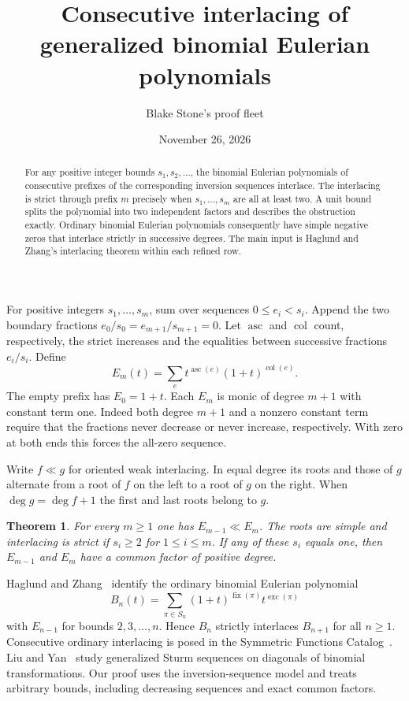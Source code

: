 \documentclass[11pt]{article}
\title{Consecutive interlacing of generalized binomial Eulerian polynomials}
\author{Blake Stone's proof fleet}
\date{November 26, 2026}
\newtheorem{theorem}{Theorem}
\begin{document}
\maketitle
\begin{abstract}
For any positive integer bounds $s_1,s_2,\ldots$, the binomial Eulerian polynomials of consecutive prefixes of the corresponding inversion sequences interlace. The interlacing is strict through prefix $m$ precisely when $s_1,\ldots,s_m$ are all at least two. A unit bound splits the polynomial into two independent factors and describes the obstruction exactly. Ordinary binomial Eulerian polynomials consequently have simple negative zeros that interlace strictly in successive degrees. The main input is Haglund and Zhang's interlacing theorem within each refined row.
\end{abstract}

For positive integers $s_1,\ldots,s_m$, sum over sequences $0\le e_i<s_i$. Append the two boundary fractions $e_0/s_0=e_{m+1}/s_{m+1}=0$. Let $\operatorname{asc}$ and $\operatorname{col}$ count, respectively, the strict increases and the equalities between successive fractions $e_i/s_i$. Define
\[
 E_m(t)=\sum_e t^{\operatorname{asc}(e)}(1+t)^{\operatorname{col}(e)}.
\]
The empty prefix has $E_0=1+t$. Each $E_m$ is monic of degree $m+1$ with constant term one. Indeed both degree $m+1$ and a nonzero constant term require that the fractions never decrease or never increase, respectively. With zero at both ends this forces the all-zero sequence.

Write $f\ll g$ for oriented weak interlacing. In equal degree its roots and those of $g$ alternate from a root of $f$ on the left to a root of $g$ on the right. When $\deg g=\deg f+1$ the first and last roots belong to $g$.

\begin{theorem}\label{thm}
For every $m\ge1$ one has $E_{m-1}\ll E_m$. The roots are simple and interlacing is strict if $s_i\ge2$ for $1\le i\le m$. If any of these $s_i$ equals one, then $E_{m-1}$ and $E_m$ have a common factor of positive degree.
\end{theorem}

Haglund and Zhang~\cite{HZ} identify the ordinary binomial Eulerian polynomial
\[
 B_n(t)=\sum_{\pi\in S_n}(1+t)^{\operatorname{fix}(\pi)}t^{\operatorname{exc}(\pi)}
\]
with $E_{n-1}$ for bounds $2,3,\ldots,n$. Hence $B_n$ strictly interlaces $B_{n+1}$ for all $n\ge1$. Consecutive ordinary interlacing is posed in the Symmetric Functions Catalog~\cite{PA}. Liu and Yan~\cite[Sec.~5]{LY} study generalized Sturm sequences on diagonals of binomial transformations. Our proof uses the inversion-sequence model and treats arbitrary bounds, including decreasing sequences and exact common factors.
\end{document}
